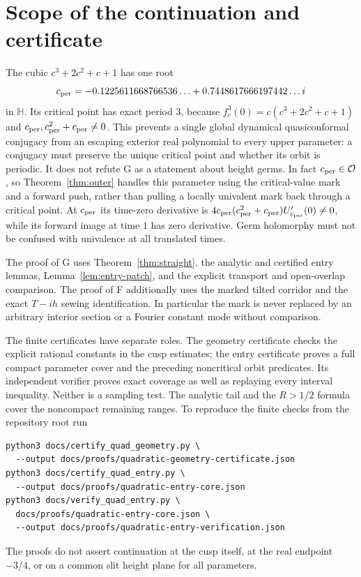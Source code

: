 \documentclass[11pt]{article}
\newcommand{\HH}{\mathbb H}
\begin{document}
\section{Scope of the continuation and certificate}
The cubic $c^3+2c^2+c+1$ has one root
\[
 c_{\rm per}=-0.1225611668766536\ldots+0.7448617666197442\ldots i
\]
in $\HH$. Its critical point has exact period $3$, because
$f_c^3(0)=c(c^3+2c^2+c+1)$ and
$c_{\rm per},c_{\rm per}^2+c_{\rm per}\ne0$.
This prevents a single global dynamical quasiconformal conjugacy from an
escaping exterior real polynomial to every upper parameter: a conjugacy
must preserve the unique critical point and whether its orbit is periodic.
It does not refute G as a statement about height germs.
In fact $c_{\rm per}\in\mathcal O$, so Theorem~\ref{thm:outer} handles this
parameter using the critical-value mark and a forward push, rather than
pulling a locally univalent mark back through a critical point.
At $c_{\rm per}$ its time-zero derivative is
$4c_{\rm per}(c_{\rm per}^2+c_{\rm per})U'_{c_{\rm per}}(0)\ne0$,
while its forward image at time $1$ has zero derivative. Germ holomorphy must not be confused with
univalence at all translated times.

The proof of G uses Theorem~\ref{thm:straight}, the analytic and certified
entry lemmas, Lemma~\ref{lem:entry-patch}, and the explicit transport and
open-overlap comparison. The proof of F additionally uses the marked
tilted corridor and the exact $T-ih$ sewing identification. In particular
the mark is never replaced by an arbitrary interior section or a Fourier
constant mode without comparison.

The finite certificates have separate roles. The geometry certificate
checks the explicit rational constants in the cusp estimates; the entry
certificate proves a full compact parameter cover and the preceding
noncritical orbit predicates. Its independent verifier proves exact
coverage as well as replaying every interval inequality. Neither is a
sampling test. The analytic tail and the $R>1/2$ formula cover the
noncompact remaining ranges. To reproduce the finite checks from the
repository root run
\begin{verbatim}
python3 docs/certify_quad_geometry.py \
  --output docs/proofs/quadratic-geometry-certificate.json
python3 docs/certify_quad_entry.py \
  --output docs/proofs/quadratic-entry-core.json
python3 docs/verify_quad_entry.py \
  docs/proofs/quadratic-entry-core.json \
  --output docs/proofs/quadratic-entry-verification.json
\end{verbatim}
The proofs do not assert continuation at the cusp itself, at the real
endpoint $-3/4$, or on a common slit height plane for all parameters.
\end{document}
